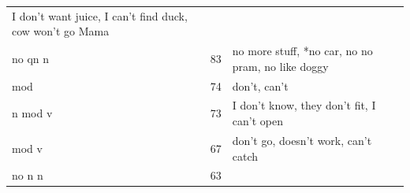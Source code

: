\documentclass[man,floatsintext,draftall]{apa6}
\begin{document}
\begin{longtable}[]{@{}lll@{}}
\begin{minipage}[t]{0.47\columnwidth}
I don't want juice, I can't find duck, cow won't go Mama\strut
\end{minipage}\tabularnewline
\begin{minipage}[t]{0.23\columnwidth}\raggedright\strut
no qn n\strut
\end{minipage} & \begin{minipage}[t]{0.15\columnwidth}\raggedright\strut
83\strut
\end{minipage} & \begin{minipage}[t]{0.47\columnwidth}\raggedright\strut
no more stuff, *no car, no no pram, no like doggy\strut
\end{minipage}\tabularnewline
\begin{minipage}[t]{0.23\columnwidth}\raggedright\strut
mod\strut
\end{minipage} & \begin{minipage}[t]{0.15\columnwidth}\raggedright\strut
74\strut
\end{minipage} & \begin{minipage}[t]{0.47\columnwidth}\raggedright\strut
don't, can't\strut
\end{minipage}\tabularnewline
\begin{minipage}[t]{0.23\columnwidth}\raggedright\strut
n mod v\strut
\end{minipage} & \begin{minipage}[t]{0.15\columnwidth}\raggedright\strut
73\strut
\end{minipage} & \begin{minipage}[t]{0.47\columnwidth}\raggedright\strut
I don't know, they don't fit, I can't open\strut
\end{minipage}\tabularnewline
\begin{minipage}[t]{0.23\columnwidth}\raggedright\strut
mod v\strut
\end{minipage} & \begin{minipage}[t]{0.15\columnwidth}\raggedright\strut
67\strut
\end{minipage} & \begin{minipage}[t]{0.47\columnwidth}\raggedright\strut
don't go, doesn't work, can't catch\strut
\end{minipage}\tabularnewline
\begin{minipage}[t]{0.23\columnwidth}\raggedright\strut
no n n\strut
\end{minipage} & \begin{minipage}[t]{0.15\columnwidth}\raggedright\strut
63\strut
\end{minipage} & \begin{minipage}[t]{0.47\columnwidth}\raggedright\strut

\end{minipage}
\end{longtable}
\end{document}
